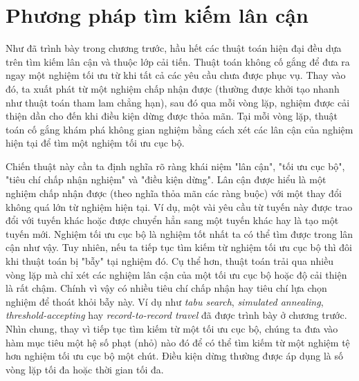\chapter{Phương pháp tìm kiếm lân cận}
\label{chap:search}

Như đã trình bày trong chương trước, hầu hết các thuật toán hiện đại đều dựa trên tìm kiếm lân cận và thuộc lớp cải tiến. Thuật toán không cố gắng để đưa ra ngay một nghiệm tối ưu từ khi tất cả các yêu cầu chưa được phục vụ. Thay vào đó, ta xuất phát từ một nghiệm chấp nhận được (thường được khởi tạo nhanh như thuật toán tham lam chẳng hạn), sau đó qua mỗi vòng lặp, nghiệm được cải thiện dần cho đến khi điều kiện dừng được thỏa mãn. Tại mỗi vòng lặp, thuật toán cố gắng khám phá không gian nghiệm bằng cách xét các lân cận của nghiệm hiện tại để tìm một nghiệm tối ưu cục bộ. 

Chiến thuật này cần ta định nghĩa rõ ràng khái niệm "lân cận", "tối ưu cục bộ", "tiêu chí chấp nhận nghiệm" và "điều kiện dừng". Lân cận được hiểu là một nghiệm chấp nhận được (theo nghĩa thỏa mãn các ràng buộc) với một thay đổi không quá lớn từ nghiệm hiện tại. Ví dụ, một vài yêu cầu từ tuyến này được trao đổi với tuyến khác hoặc được chuyển hẳn sang một tuyến khác hay là tạo một tuyến mới. Nghiệm tối ưu cục bộ là nghiệm tốt nhất ta có thể tìm được trong lân cận như vậy. Tuy nhiên, nếu ta tiếp tục tìm kiếm từ nghiệm tối ưu cục bộ thì đôi khi thuật toán bị "bẫy" tại nghiệm đó. Cụ thể hơn, thuật toán trải qua nhiều vòng lặp mà chỉ xét các nghiệm lân cận của một tối ưu cục bộ hoặc độ cải thiện là rất chậm. Chính vì vậy có nhiều tiêu chí chấp nhận hay tiêu chí lựa chọn nghiệm để thoát khỏi bẫy này. Ví dụ như \textit{tabu search}, \textit{simulated annealing}, \textit{threshold-accepting} hay \textit{record-to-record travel} đã được trình bày ở chương trước. Nhìn chung, thay vì tiếp tục tìm kiếm từ một tối ưu cục bộ, chúng ta đưa vào hàm mục tiêu một hệ số phạt (nhỏ) nào đó để có thể tìm kiếm từ một nghiệm tệ hơn nghiệm tối ưu cục bộ một chút. Điều kiện dừng thường được áp dụng là số vòng lặp tối đa hoặc thời gian tối đa.



